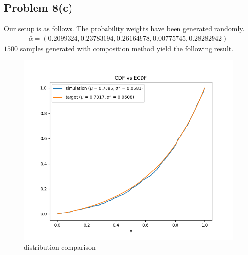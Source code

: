 \documentclass{article}
\begin{document}
\subsection*{Problem 8(c)}
Our setup is as follows. The probability weights have been generated randomly.
\begin{align*}
  \bar\alpha = (0.2099324, 0.23783094, 0.26164978, 0.00775745, 0.28282942)
\end{align*}
$1500$ samples generated with composition method yield the following result.
\begin{figure}[h!]
    \centering
    \includegraphics[width=\linewidth]{../images/p8c_5_1500.png}
    \caption{distribution comparison}
\end{figure}
\newpage
\end{document}

